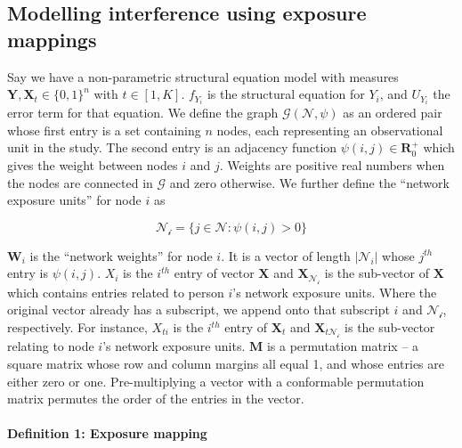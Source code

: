 \documentclass[
  letterpaper,
  DIV=11,
  numbers=noendperiod,
  oneside]{scrreprt}
\let\oldparagraph\paragraph
\renewcommand{\paragraph}[1]{\oldparagraph{#1}\mbox{}}
\begin{document}
\hypertarget{modelling-interference-using-exposure-mappings}{%
\subsection*{Modelling interference using exposure
mappings}\label{modelling-interference-using-exposure-mappings}}

Say we have a non-parametric structural equation model with measures
\(\mathbf{Y}, \mathbf{X}_t \in \{0,1\}^n\) with \(t \in [1,K]\).
\(f_{Y_i}\) is the structural equation for \(Y_i\), and \(U_{Y_i}\) the
error term for that equation. We define the graph
\(\mathscr{G}(\mathscr{N}, \psi)\) as an ordered pair whose first entry
is a set containing \(n\) nodes, each representing an observational unit
in the study. The second entry is an adjacency function
\(\psi(i,j) \in \mathbf{R}^+_0\) which gives the weight between nodes
\(i\) and \(j\). Weights are positive real numbers when the nodes are
connected in \(\mathscr{G}\) and zero otherwise. We further define the
``network exposure units'' for node \(i\) as

\[
\mathscr{N_i} = \{j \in \mathscr{N}: \psi(i, j) > 0\}
\]

\(\mathbf{W}_i\) is the ``network weights'' for node \(i\). It is a
vector of length \(|\mathscr{N}_i|\) whose \(j^{th}\) entry is
\(\psi(i,j)\). \(X_i\) is the \(i^{th}\) entry of vector \(\mathbf{X}\)
and \(\mathbf{X}_{\mathscr{N_i}}\) is the sub-vector of \(\mathbf{X}\)
which contains entries related to person \(i\)'s network exposure units.
Where the original vector already has a subscript, we append onto that
subscript \(i\) and \(\mathscr{N_i}\), respectively. For instance,
\(X_{ti}\) is the \(i^{th}\) entry of \(\mathbf{X}_t\) and
\(\mathbf{X}_{t\mathscr{N_i}}\) is the sub-vector relating to node
\(i\)'s network exposure units. \(\mathbf{M}\) is a permutation matrix
-- a square matrix whose row and column margins all equal 1, and whose
entries are either zero or one. Pre-multiplying a vector with a
conformable permutation matrix permutes the order of the entries in the
vector.

\hypertarget{definition-1-exposure-mapping}{%
\paragraph{\texorpdfstring{\textbf{Definition 1: Exposure
mapping}}{Definition 1: Exposure mapping}}\label{definition-1-exposure-mapping}}
\end{document}
